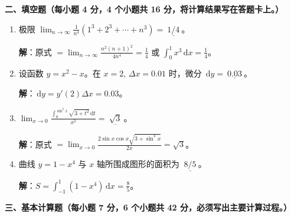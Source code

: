 \documentclass[a4paper,11pt]{ctexart}
\newcommand{\dd}{\,\mathrm{d}}
\begin{document}
\vspace{0.8em}

\textbf{二、填空题（每小题 4 分，4 个小题共 16 分，将计算结果写在答题卡上。）}

\begin{enumerate}[label=\arabic*., start=7, leftmargin=2em, itemsep=0.8em, topsep=0.5em]
  \item 极限 $\displaystyle\lim_{n\to\infty}\frac{1}{n^4}(1^3+2^3+\cdots+n^3)=\underline{\ 1/4\ }$。

  \textbf{解}：原式 $=\displaystyle\lim_{n\to\infty}\frac{n^2(n+1)^2}{4n^4}=\frac{1}{4}$ 或 $\displaystyle\int_0^1 x^3\dd x=\frac{1}{4}$。

  \item 设函数 $y=x^2-x$。在 $x=2,\,\Delta x=0.01$ 时，微分 $\dd y=\underline{\ 0.03\ }$。

  \textbf{解}：$\dd y=y'(2)\Delta x=0.03$。

  \item $\displaystyle\lim_{x\to 0}\frac{\displaystyle\int_0^{\sin^2 x}\sqrt{3+t^2}\dd t}{x^2}=\underline{\ \sqrt{3}\ }$。

  \textbf{解}：原式 $=\displaystyle\lim_{x\to 0}\frac{2\sin x\cos x\sqrt{3+\sin^4 x}}{2x}=\sqrt{3}$。

  \item 曲线 $y=1-x^4$ 与 $x$ 轴所围成图形的面积为 $\underline{\ 8/5\ }$。

  \textbf{解}：$S=\displaystyle\int_{-1}^1(1-x^4)\dd x=\frac{8}{5}$。
\end{enumerate}

\vspace{0.8em}

\textbf{三、基本计算题（每小题 7 分，6 个小题共 42 分，必须写出主要计算过程。）}
\end{document}
